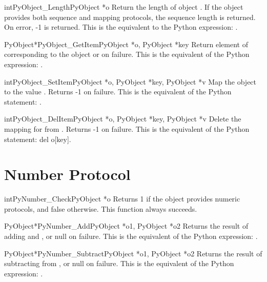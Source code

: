      \begin{cfuncdesc}{int}{PyObject_Length}{PyObject *o}
         Return the length of object .  If the object  provides
	 both sequence and mapping protocols, the sequence length is
	 returned. On error, -1 is returned.  This is the equivalent
	 to the Python expression: .
     \end{cfuncdesc}


     \begin{cfuncdesc}{PyObject*}{PyObject_GetItem}{PyObject *o, PyObject *key}
	 Return element of  corresponding to the object  or {\NULL}
	 on failure. This is the equivalent of the Python expression:
	 .
     \end{cfuncdesc}


     \begin{cfuncdesc}{int}{PyObject_SetItem}{PyObject *o, PyObject *key, PyObject *v}
	 Map the object  to the value .
	 Returns -1 on failure.  This is the equivalent
	 of the Python statement: .
     \end{cfuncdesc}


     \begin{cfuncdesc}{int}{PyObject_DelItem}{PyObject *o, PyObject *key, PyObject *v}
	 Delete the mapping for  from .  Returns -1
	 on failure.
	 This is the equivalent of the Python statement: del o[key].
     \end{cfuncdesc}


\section{Number Protocol}

     \begin{cfuncdesc}{int}{PyNumber_Check}{PyObject *o}
         Returns 1 if the object  provides numeric protocols, and
	 false otherwise. 
	 This function always succeeds.
     \end{cfuncdesc}


     \begin{cfuncdesc}{PyObject*}{PyNumber_Add}{PyObject *o1, PyObject *o2}
	 Returns the result of adding  and , or null on failure.
	 This is the equivalent of the Python expression: .
     \end{cfuncdesc}


     \begin{cfuncdesc}{PyObject*}{PyNumber_Subtract}{PyObject *o1, PyObject *o2}
	 Returns the result of subtracting  from , or null on
	 failure.  This is the equivalent of the Python expression:
	 .
     \end{cfuncdesc}


